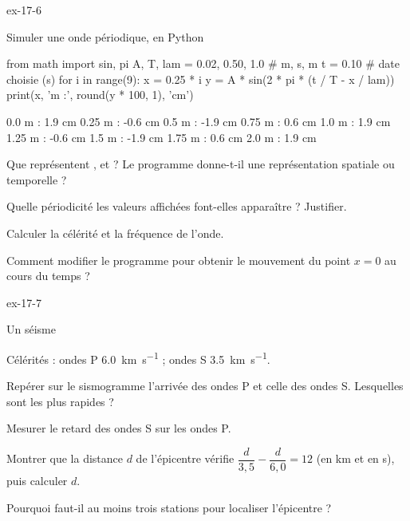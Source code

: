 \begin{blocLivre}{ex-17-6}
\begin{exercice}[2]{Simuler une onde périodique, en Python}
\begin{python}
from math import sin, pi
A, T, lam = 0.02, 0.50, 1.0          # m, s, m
t = 0.10                             # date choisie (s)
for i in range(9):
    x = 0.25 * i
    y = A * sin(2 * pi * (t / T - x / lam))
    print(x, 'm :', round(y * 100, 1), 'cm')
\end{python}
\begin{console}
0.0 m : 1.9 cm
0.25 m : -0.6 cm
0.5 m : -1.9 cm
0.75 m : 0.6 cm
1.0 m : 1.9 cm
1.25 m : -0.6 cm
1.5 m : -1.9 cm
1.75 m : 0.6 cm
2.0 m : 1.9 cm
\end{console}
\begin{questions}
\item {}Que représentent ,  et  ? Le programme donne-t-il une représentation spatiale ou temporelle ?
\item Quelle périodicité les valeurs affichées font-elles apparaître ? Justifier.
\item Calculer la célérité et la fréquence de l'onde.
\item Comment modifier le programme pour obtenir le mouvement du point $x=0$ au cours du temps ?
\end{questions}
\end{exercice}
\end{blocLivre}
\begin{blocLivre}{ex-17-7}
\begin{exercice}[2]{Un séisme}
\begin{donnees}
Célérités : ondes P \qty{6,0}{km.s^{-1}} ; ondes S \qty{3,5}{km.s^{-1}}.
\end{donnees}
\begin{questions}
\item Repérer sur le sismogramme l'arrivée des ondes P et celle des ondes S. Lesquelles sont les plus rapides ?
\item Mesurer le retard des ondes S sur les ondes P.
\item Montrer que la distance $d$ de l'épicentre vérifie $\dfrac{d}{3{,}5}-\dfrac{d}{6{,}0}=12$ (en km et en s), puis calculer $d$.
\item Pourquoi faut-il au moins trois stations pour localiser l'épicentre ?
\end{questions}
\end{exercice}
\end{blocLivre}
